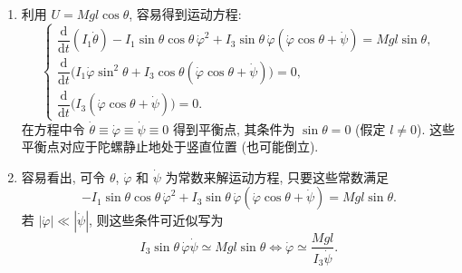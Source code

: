 \begin{description}[font=\normalfont,leftmargin=2em,labelwidth=1.5em]
\begin{enumerate}[label=(\alph*),ref=\alph*,leftmargin=*]
\item 利用 $U=Mgl\cos\theta$, 容易得到运动方程:
\[
  \begin{cases}
    \dfrac{\mathrm{d}}{\mathrm{d}t}(I_1\dot\theta)
     -I_1\sin\theta\cos\theta\,\dot\varphi^2
     +I_3\sin\theta\,\dot\varphi(\dot\varphi\cos\theta+\dot\psi)=Mgl\sin\theta,\\[4pt]
    \dfrac{\mathrm{d}}{\mathrm{d}t}\bigl(I_1\dot\varphi\sin^2\theta
      +I_3\cos\theta(\dot\varphi\cos\theta+\dot\psi)\bigr)=0,\\[4pt]
    \dfrac{\mathrm{d}}{\mathrm{d}t}\bigl(I_3(\dot\varphi\cos\theta+\dot\psi)\bigr)=0.
  \end{cases}
\]
在方程中令 $\dot\theta\equiv\dot\varphi\equiv\dot\psi\equiv0$ 得到平衡点, 其条件为 $\sin\theta=0$ (假定 $l\ne0$). 这些平衡点对应于陀螺静止地处于竖直位置 (也可能倒立).
\item 容易看出, 可令 $\theta$, $\dot\varphi$ 和 $\dot\psi$ 为常数来解运动方程, 只要这些常数满足
\[
  -I_1\sin\theta\cos\theta\,\dot\varphi^2
    +I_3\sin\theta\,\dot\varphi(\dot\varphi\cos\theta+\dot\psi)=Mgl\sin\theta.
\]
若 $|\dot\varphi|\ll|\dot\psi|$, 则这些条件可近似写为
\[
  I_3\sin\theta\,\dot\varphi\dot\psi\simeq Mgl\sin\theta
   \iff\dot\varphi\simeq\frac{Mgl}{I_3\dot\psi}.
\]
\end{enumerate}
\end{description}
